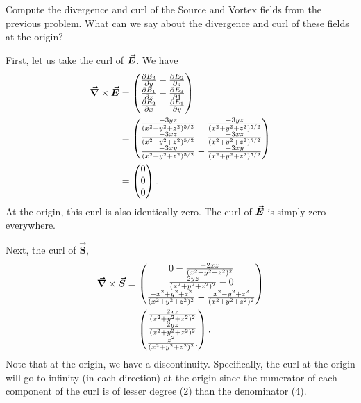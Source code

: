 \documentclass[12pt]{article} %
\begin{document}
\newpage
\begin{problem}
Compute the divergence and curl of the Source and Vortex fields from the previous problem.  What can we say about the divergence and curl of these fields at the origin?
\end{problem}
\begin{solution}
    First, let us take the curl of $\boldsymbol{\vec{E}}$.  We have
    \begin{align*}
        \boldsymbol{\vec{\nabla}} \times \boldsymbol{\vec{E}} &= \begin{pmatrix} \frac{\partial E_3}{\partial y} - \frac{\partial E_2}{\partial z} \\ \frac{\partial E_1}{\partial z} -\frac{\partial E_3}{\partial 1} \\ \frac{\partial E_2}{\partial x} - \frac{\partial E_1}{\partial y} \end{pmatrix}\\
        &= \begin{pmatrix} \frac{-3yz}{(x^2+y^2+z^2)^{5/2}} - \frac{-3yz}{(x^2+y^2+z^2)^{5/2}} \\ \frac{-3xz}{(x^2+y^2+z^2)^{5/2}} - \frac{-3xz}{(x^2+y^2+z^2)^{5/2}} \\
        \frac{-3xy}{(x^2+y^2+z^2)^{5/2}} -\frac{-3xy}{(x^2+y^2+z^2)^{5/2}} \end{pmatrix}\\
        &= \begin{pmatrix} 0 \\ 0 \\ 0 \end{pmatrix}.
    \end{align*}
    At the origin, this curl is also identically zero.  The curl of $\boldsymbol{\vec{E}}$ is simply zero everywhere.
    
    Next, the curl of $\boldsymbol{\vec{S}}$,
        \begin{align*}
            \boldsymbol{\vec{\nabla}} \times \boldsymbol{\vec{S}} &= \begin{pmatrix} 0 - \frac{-2xz}{(x^2+y^2+z^2)^2} \\ \frac{2yz}{(x^2+y^2+z^2)^2} - 0 \\
            \frac{-x^2+y^2+z^2}{(x^2+y^2+z^2)^2}- \frac{x^2-y^2+z^2}{(x^2+y^2+z^2)^2}\end{pmatrix}\\
            &= \begin{pmatrix}  \frac{2xz}{(x^2+y^2+z^2)^2} \\ \frac{2yz}{(x^2+y^2+z^2)^2} \\ \frac{z^2}{(x^2+y^2+z^2)^2}. \end{pmatrix}.
        \end{align*}
    Note that at the origin, we have a discontinuity.  Specifically, the curl at the origin will go to infinity (in each direction) at the origin since the numerator of each component of the curl is of lesser degree (2) than the denominator (4).
    

\end{solution}
\end{document}
